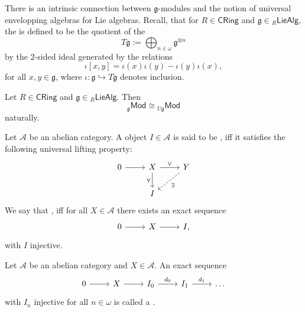 There is an intrinsic connection between $\mathfrak{g}$-modules and the notion of universal envelopping algebras for Lie algebras. Recall, that for $R \in \mathsf{CRing}$ and $\mathfrak{g} \in {_{R}\mathsf{LieAlg}}$, the  is defined to be the quotient of the 
\begin{equation*}
	T\mathfrak{g} := \bigoplus_{n \in \omega} \mathfrak{g}^{\otimes n}
\end{equation*}
\noindent by the $2$-sided ideal generated by the relations
\begin{equation*}
	\iota[x,y] = \iota(x)\iota(y) - \iota(y)\iota(x),
\end{equation*}
\noindent for all $x,y \in \mathfrak{g}$, where $\iota : \mathfrak{g} \hookrightarrow T\mathfrak{g}$ denotes inclusion. 

\begin{theorem}
	\label{thm:universal_envelopping_algebra}
	Let $R \in \mathsf{CRing}$ and $\mathfrak{g} \in {_{R}\mathsf{LieAlg}}$. Then 
	\begin{equation*}
		_{\mathfrak{g}}\mathsf{Mod} \cong {_{U\mathfrak{g}}}\mathsf{Mod}
	\end{equation*}
	\noindent naturally.
\end{theorem}



\begin{definition}[Injective]
	Let $\mathcal{A}$ be an abelian category. A object $I \in \mathcal{A}$ is said to be , iff it satisfies the following universal lifting property:
	\begin{equation*}
		\begin{tikzcd}
			0 \arrow[r] & X\arrow[r,"\forall"]\arrow[d,"\forall"'] & Y \arrow[dl,dashed,"\exists"]\\
			& I
		\end{tikzcd}
	\end{equation*}
	We say that , iff for all $X \in \mathcal{A}$ there exists an exact sequence
	\begin{equation*}
		\begin{tikzcd}
			0 \arrow[r] & X \arrow[r] & I,
		\end{tikzcd}
	\end{equation*}
	\noindent with $I$ injective.
\end{definition}

\begin{definition}
	Let $\mathcal{A}$ be an abelian category and $X \in \mathcal{A}$. An exact sequence
	\begin{equation*}
		\begin{tikzcd}
			0 \arrow[r] & X \arrow[r] & I_0 \arrow[r,"d_0"] & I_1 \arrow[r,"d_1"] & \dots
		\end{tikzcd}
	\end{equation*}
	\noindent with $I_n$ injective for all $n \in \omega$ is called a .
\end{definition}

